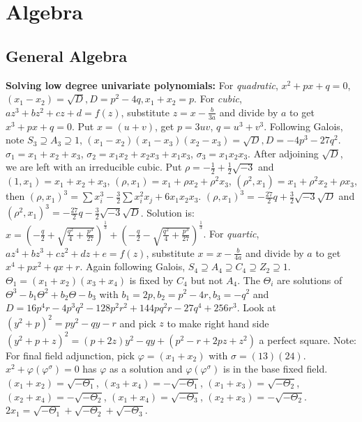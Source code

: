 \section{Algebra}
\subsection{General Algebra}
{\bf Solving low degree univariate polynomials:}
For \emph{quadratic},  $x^2+px+q=0$, $(x_1-x_2)= {\sqrt D}, D= p^2-4q, x_1+x_2=p$.
For \emph{cubic}, $az^3 + bz^2 + cz + d= f(z)$, substitute $z= x - {\frac {b} {3a}}$ and
divide by $a$ to get $x^3+ px+ q= 0$.  Put $x= (u+v)$, get $p=3uv$,
$q= u^3 + v^3$.  Following Galois, note $S_3 \supseteq A_3 \supseteq 1$,
$(x_1 -x_2)(x_1-x_3)(x_2-x_3)= {\sqrt D}, D= -4p^3-27q^2$.
$\sigma_1 = x_1 + x_2 + x_3$, 
$\sigma_2 = x_1 x_2 + x_2 x_3 + x_1 x_3$, 
$\sigma_3 = x_1 x_2 x_3$.
After adjoining
${\sqrt D}$, we are left with an irreducible cubic.  Put $\rho=
-{\frac 1 2} + {\frac 1 2} {\sqrt {-3}}$ and 
$(1,x_1 )= x_1 +x_2 + x_3$, $(\rho, x_1 )= x_1 + \rho x_2 + \rho^2 x_3$,
$(\rho^2, x_1 )= x_1 + \rho^2 x_2 + \rho x_3$, then
$(\rho, x_1 )^3= \sum x_i^3  - {\frac 3 2} \sum x_i^2 x_j + 6 x_1 x_2 x_3$.
$(\rho, x_1 )^3= - {\frac {27} {2}}q + {\frac 3 2} {\sqrt {-3}} {\sqrt {D}}$ and
$(\rho^2, x_1 )^3= - {\frac {27} {2}}q - {\frac 3 2} {\sqrt {-3}} {\sqrt {D}}$.
Solution is:
$x= ({-{\frac {q} {2}} + {\sqrt {{\frac{q^2} {4}} + {\frac {p^3} {27}}}}})^{\frac {1} {3}} +
({-{\frac {q} {2}} - {\sqrt {{\frac{q^2} {4}} + {\frac {p^3} {27}}}}})^{\frac {1} {3}}$.  
For \emph{quartic}, $az^4 + bz^3 + cz^2 + dz+e= f(z)$, 
substitute $x= x - {\frac {b} {4a}}$ and
divide by $a$ to get $x^4+ px^2 + qx + r$.  Again following Galois,
$S_4 \supseteq A_4 \supseteq C_4 \supseteq Z_2 \supseteq 1$.  
$\Theta_1 = (x_1+x_2)(x_3+x_4)$ is fixed by $C_4$ but not $A_4$.
The $\Theta_i$ are solutions of $\Theta^3 -b_1 \Theta^2 + b_2 \Theta -b_3$ with
$b_1= 2p, b_2= p^2-4r, b_3= -q^2$ and
$D=16 p^4r-4p^3q^2-128p^2r^2+144 p q^2r -27 q^4 +256 r^3$.
Look at
$(y^2 + p)^2 = py^2 -qy -r$ and pick $z$ to make right hand side
$(y^2 + p + z)^2 = (p+2z)y^2 -qy + (p^2 -r +2pz + z^2 )$ a perfect square. Note:
For final field adjunction, pick $\varphi= (x_1 +x_2)$ with $\sigma = (13)(24)$.
$x^2+\varphi (\varphi^{\sigma})= 0$ has $\varphi$  as a solution and $\varphi (\varphi^{\sigma})$ is in
the base fixed field.
$(x_1 +x_2)= \sqrt{-\Theta_1}$,
$(x_3 +x_4)= -\sqrt{-\Theta_1}$,
$(x_1 +x_3)= \sqrt{-\Theta_2}$,
$(x_2 +x_4)= -\sqrt{-\Theta_2}$,
$(x_1 +x_4)= \sqrt{-\Theta_3}$,
$(x_2 +x_3)= -\sqrt{-\Theta_2}$.
$2 x_1 = \sqrt{-\Theta_1} + \sqrt{-\Theta_2}+ \sqrt{-\Theta_3}$.
